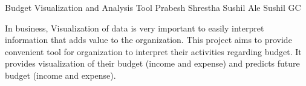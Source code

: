  \begin{conf-abstract}[]
 {Budget Visualization and Analysis Tool }
 {Prabesh Shrestha
 	Sushil Ale
 	Sushil GC
 }
{}

 In business, Visualization of data is very important to easily interpret information that adds value to the organization. This project aims to provide convenient tool for organization to interpret their activities regarding budget. It provides visualization of  their budget (income and expense) and predicts future budget (income and expense).  
 \end{conf-abstract}